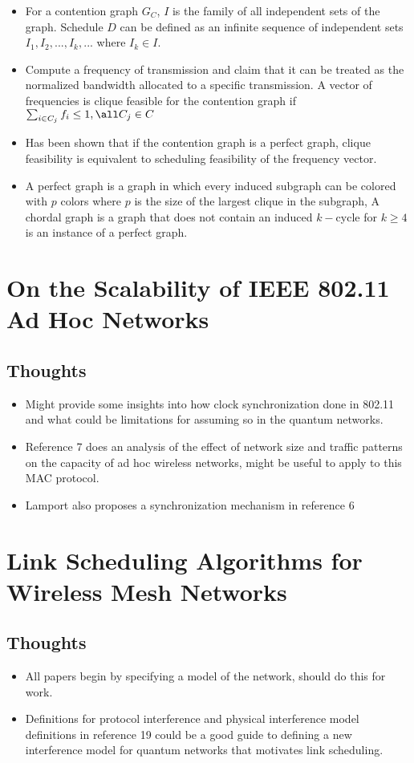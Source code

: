 \documentclass{article}
\begin{document}
\begin{itemize}
    \item For a contention graph $G_C$, $I$ is the family of all independent sets of the graph.  Schedule $D$ can be defined as an infinite sequence of independent sets $I_1, I_2,...,I_k,...$ where $I_k \in I$.
    \item Compute a frequency of transmission and claim that it can be treated as the normalized bandwidth allocated to a specific transmission.  A vector of frequencies is clique feasible for the contention graph if $\sum_{i \in C_j} f_i \leq 1, \all C_j \in C$
    \item Has been shown that if the contention graph is a perfect graph, clique feasibility is equivalent to scheduling feasibility of the frequency vector.
    \item A perfect graph is a graph in which every induced subgraph can be colored with $p$ colors where $p$ is the size of the largest clique in the subgraph,  A chordal graph is a graph that does not contain an induced $k-$cycle for $k \geq 4$ is an instance of a perfect graph. 
\end{itemize}

\section{On the Scalability of IEEE 802.11 Ad Hoc Networks}
\subsection{Thoughts}
\begin{itemize}
    \item Might provide some insights into how clock synchronization done in 802.11 and what could be limitations for assuming so in the quantum networks.
    \item Reference 7 does an analysis of the effect of network size and traffic patterns on the capacity of ad hoc wireless networks, might be useful to apply to this MAC protocol.
    \item Lamport also proposes a synchronization mechanism in reference 6
\end{itemize}

\section{Link Scheduling Algorithms for Wireless Mesh Networks}
\subsection{Thoughts}
\begin{itemize}
    \item All papers begin by specifying a model of the network, should do this for work.
    \item Definitions for protocol interference and physical interference model definitions in reference 19 could be a good guide to defining a new interference model for quantum networks that motivates link scheduling.
\end{itemize}
\end{document}
